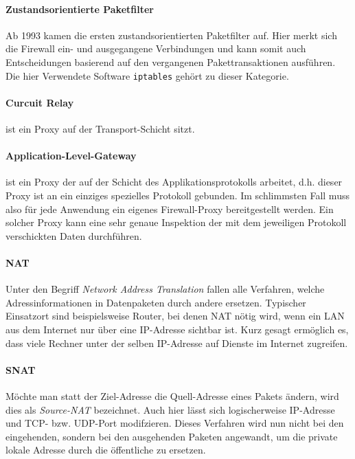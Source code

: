 \paragraph{Zustandsorientierte Paketfilter} Ab 1993 kamen die ersten
zustandsorientierten Paketfilter auf. Hier merkt sich die Firewall
ein- und ausgegangene Verbindungen und kann somit auch Entscheidungen
basierend auf den vergangenen Pakettransaktionen ausführen.
Die hier Verwendete Software {\tt iptables} gehört zu dieser Kategorie.\cite{iptables}

\paragraph{Curcuit Relay} ist ein Proxy auf der Transport-Schicht sitzt.

\paragraph{Application-Level-Gateway} ist ein Proxy der auf der Schicht
des Applikationsprotokolls arbeitet, d.h. dieser Proxy ist an ein einziges
spezielles Protokoll gebunden. Im schlimmsten Fall muss also für jede
Anwendung ein eigenes Firewall-Proxy bereitgestellt werden.
Ein solcher Proxy kann eine sehr genaue Inspektion der mit dem jeweiligen
Protokoll verschickten Daten durchführen.\cite{iptables}

\paragraph{NAT}
Unter den Begriff \emph{Network Address Translation} fallen alle Verfahren,
welche Adressinformationen in Datenpaketen durch andere ersetzen.
Typischer Einsatzort sind beispielsweise Router, bei denen NAT nötig wird,
wenn ein LAN aus dem Internet nur über eine IP-Adresse sichtbar ist.
Kurz gesagt ermöglich es, dass viele Rechner unter der selben IP-Adresse auf Dienste
im Internet zugreifen.\cite{iptables}

\paragraph{SNAT}
Möchte man statt der Ziel-Adresse die Quell-Adresse eines Pakets ändern, wird
dies als \emph{Source-NAT} bezeichnet.
Auch hier lässt sich logischerweise IP-Adresse und TCP- bzw. UDP-Port
modifzieren.
Dieses Verfahren wird nun nicht bei den eingehenden, sondern bei den ausgehenden
Paketen angewandt, um die private lokale Adresse durch die öffentliche zu
ersetzen.


